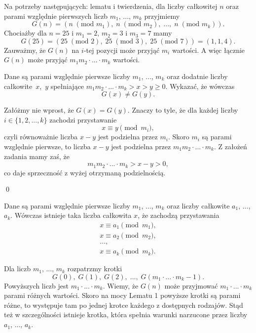 

\noindent
Na potrzeby następujących: lematu i twierdzenia, dla liczby całkowitej $n$ oraz parami względnie pierwszych liczb $m_1$, ..., $m_k$ przyjmiemy
\[
	G(n) = (n \;(\text{mod } m_1),\; n \;(\text{mod } m_2),\; ...,\; n \;(\text{mod } m_k)).
\]
Chociażby dla $n = 25$ i $m_1 = 2$, $m_2 = 3$ i $m_3 = 7$ mamy
\[
	G(25) = (25 \;(\text{mod } 2),\; 25 \;(\text{mod } 3),\; 25 \;(\text{mod } 7)) = (1, 1, 4).
\]
Zauważmy, że $G(n)$ na $i$-tej pozycji może przyjąć $m_i$ wartości. A więc łącznie $G(n)$ może przyjąć $m_1m_2\cdot...\cdot m_k$ wartości.

\vspace{10px}


\noindent
Dane są parami względnie pierwsze liczby $m_1$, ..., $m_k$ oraz dodatnie liczby całkowite~$x$,~$y$ spełniające $m_1m_2\cdot ... \cdot m_k > x > y \geqslant 0$. Wykazać, że wówczas
\[
	G(x) \neq G(y).
\]


\noindent
Załóżmy nie wprost, że $G(x) = G(y)$. Znaczy to tyle, że dla każdej liczby $i \in \{1, 2, ..., k\}$ zachodzi przystawanie
\[
	x \equiv y \pmod{m_i},
\]
czyli równoważnie liczba $x - y$ jest podzielna przez $m_i$. Skoro $m_i$ są parami względnie pierwsze, to liczba $x - y$ jest podzielna przez $m_1m_2 \cdot ... \cdot m_k$. Z założeń zadania mamy zaś, że
\[
	m_1m_2 \cdot ... \cdot m_k > x - y > 0,
\]
co daje sprzeczność z wyżej otrzymaną podzielnością.

\qed

\vspace{10px}


\noindent
Dane są parami względnie pierwsze liczby $m_1$, ..., $m_k$ oraz  liczby całkowite $a_1$, ..., $a_k$. Wówczas istnieje taka liczba całkowita $x$, że zachodzą przystawania
\begin{gather*}
	x \equiv a_1 \pmod{m_1}, \\
	x \equiv a_2 \pmod{m_2}, \\
	..., \\
	x \equiv a_k \pmod{m_k}.
\end{gather*}


\noindent
Dla liczb $m_1$, ..., $m_k$ rozpatrzmy krotki
\[
	G(0),\; G(1),\; G(2),\; ...,\; G(m_1 \cdot ...\cdot m_k - 1).
\]
Powyższych liczb jest $m_1 \cdot ...\cdot m_k$. Wiemy, że $G(n)$ może przyjmować $m_1 \cdot ...\cdot m_k$ parami różnych wartości. Skoro na mocy Lematu 1 powyższe krotki są parami różne, to występuje tam po jednej krotce każdego z dostępnych rodzajów. Stąd też w szczególności istnieje krotka, która spełnia warunki narzucone przez liczby $a_1$, ..., $a_k$.

